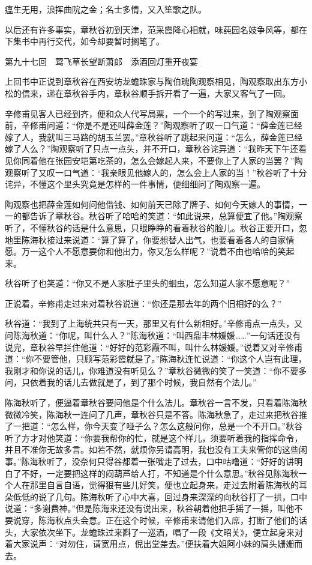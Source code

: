 \documentclass[12pt,UTF8]{ctexbook}
\begin{document}
{{{瘟生无用，浪挥曲院之金；名士多情，又入笙歌之队。

以后还有许多事实，章秋谷初到天津，范采霞降心相就，味莼园名妓争风等，都在下集书中再行交代，如今却要暂时搁笔了。





第九十七回　莺飞草长望断萧郎　添酒回灯重开夜宴





上回书中正说到章秋谷在西安坊龙蟾珠家与陶伯瑰陶观察相见，陶观察取出东方小松的信来，递在章秋谷手内，章秋谷顺手拆开看了一遍，大家又客气了一回。

辛修甫见客人已经到齐，便和众人代写局票，一个一个的写过来，到了陶观察面前，辛修甫问道：“你是不是还叫薛金莲？”陶观察听了叹一口气道：“薛金莲已经嫁了人，我就叫三马路的胡玉兰罢。”章秋谷听了跳起来问道：“怎么，薛金莲已经嫁了人么？”陶观察听了只点一点头，并不开口，章秋谷诧异道：“我昨天下午还看见你同着他在张园安垲第吃茶的，怎么会嫁起人来，不要你上了人家的当罢？”陶观察听了又叹一口气道：“我亲眼见他嫁人的，怎么会上人家的当！”秋谷听了十分诧异，不懂这个里头究竟是怎样的一件事情，便细细问了陶观察一遍。

陶观察也把薛金莲如何问他借钱、如何前天已除了牌子、如何今天嫁人的事情，一一的都告诉了章秋谷。秋谷听了哈哈的笑道：“如此说来，总算便宜了他。”陶观察听了，不懂秋谷的话是什么意思，只眼睁睁的看着秋谷的脸儿。秋谷正要开口，忽地里陈海秋接过来说道：“算了算了，你要想替人出气，也要看着各人的自家情愿。万一这个人不愿意要你和他出力，你又怎么样呢？”说着不由也哈哈的笑起来。

秋谷听了也笑道：“你又不是人家肚子里头的蛔虫，怎么知道人家不愿意呢？”

正说着，辛修甫走过来对着秋谷说道：“你还是那去年的两个旧相好的么？”

秋谷道：“我到了上海统共只有一天，那里又有什么新相好。”辛修甫点一点头，又问陈海秋道：“你呢，叫什么人？”陈海秋道：“叫西鼎丰林媛媛……”一句话还没有说完，章秋谷早拦住他道：“好好的范彩霞不叫，叫什么林媛媛。”说着又对辛修甫道：“你不要管他，只顾写范彩霞就是了。”陈海秋连忙说道：“你这个人岂有此理，我刚才和你说的话儿，你难道没有听见么？”章秋谷微微的笑了一笑道：“你不要多问，只依着我的话儿去做就是了，到了那个时候，我自然有个法儿。”

陈海秋听了，便逼着章秋谷要问他是个什么法儿。章秋谷一言不发，只看着陈海秋微微冷笑，陈海秋一连问了几声，章秋谷只是不答。陈海秋急了，走过来把秋谷推了一把道：“怎么样，你今天变了哑子么？怎么这般问你，总是一个不开口。”秋谷听了方才对他笑道：“你要我帮你的忙，就是这个样儿，须要听着我的指挥命令，并且不准你无故多言。如若不然，就烦你另请高明，我也没有工夫来管你的这些闲事。”陈海秋听了，没奈何只得谷都着一张嘴走了过去，口中咕噜道：“好好的讲明白了不好，一定要把这样的闷葫芦给人打，不知道是个什么意思。”秋谷见陈海秋一个人在那里自言自语，觉得狠有些儿好笑，便也立起身来，走过去附着陈海秋的耳朵低低的说了几句。陈海秋听了心中大喜，回过身来深深的向秋谷打了一拱，口中说道：“多谢费神。”但是陈海来还没有说出来，秋谷朝着他把手摇了一摇，叫他不要说穿，陈海秋点头会意。正在这个时候，辛修甫来请他们入席，打断了他们的话头，大家依次坐下。龙蟾珠过来斟了一巡酒，唱了一段《文昭关》，便立起身来对着大家说声：“对勿住，请宽用点，倪出堂差去。”便扶着大姐阿小妹的肩头姗姗而去。

}}}
\end{document}
